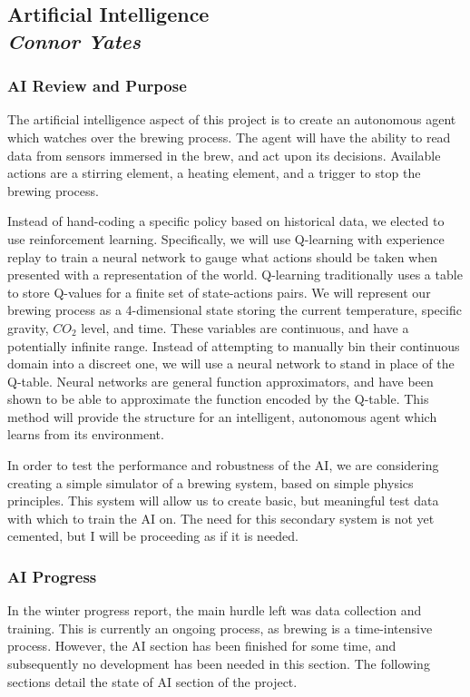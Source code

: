 \documentclass[draftclsnofoot,onecolumn,letterpaper,10pt]{IEEEtran}
\begin{document}
\vfill
\clearpage


\subsection{Artificial Intelligence\\{\em\textbf{Connor Yates}}}
\subsubsection{AI Review and Purpose}
The artificial intelligence aspect of this project is to create an autonomous agent which watches over the brewing process.
The agent will have the ability to read data from sensors immersed in the brew, and act upon its decisions.
Available actions are a stirring element, a heating element, and a trigger to stop the brewing process.

Instead of hand-coding a specific policy based on historical data, we elected to use reinforcement learning.
Specifically, we will use Q-learning with experience replay to train a neural network to gauge what actions should be taken when presented with a representation of the world.
Q-learning traditionally uses a table to store Q-values for a finite set of state-actions pairs.
We will represent our brewing process as a 4-dimensional state storing the current temperature, specific gravity, $CO_2$ level, and time.
These variables are continuous, and have a potentially infinite range.
Instead of attempting to manually bin their continuous domain into a discreet one, we will use a neural network to stand in place of the Q-table.
Neural networks are general function approximators, and have been shown to be able to approximate the function encoded by the Q-table.
This method will provide the structure for an intelligent, autonomous agent which learns from its environment.

In order to test the performance and robustness of the AI, we are considering creating a simple simulator of a brewing system, based on simple physics principles.
This system will allow us to create basic, but meaningful test data with which to train the AI on.
The need for this secondary system is not yet cemented, but I will be proceeding as if it is needed.

\subsubsection{AI Progress}
In the winter progress report, the main hurdle left was data collection and training. This is currently an ongoing process, as brewing is a time-intensive process. However, the AI section has been finished for some time, and subsequently no development has been needed in this section. The following sections detail the state of AI section of the project.
\end{document}
